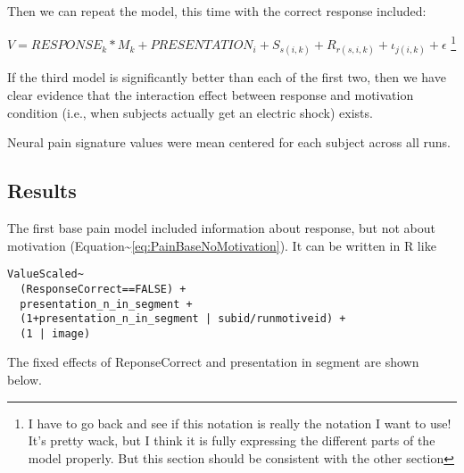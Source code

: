 \documentclass[]{article}
\let\rmarkdownfootnote\footnote%
\def\footnote{\protect\rmarkdownfootnote}
\begin{document}
Then we can repeat the model, this time with the correct response
included:

\(V=\mathit{RESPONSE}_k*M_k+\mathit{PRESENTATION}_{i} + S_{s(i, k )} + R_{r(s,i , k )} + \iota_{j(i, k)} + \epsilon\)
\footnote{I have to go back and see if this notation is really the notation I want to use! It's pretty wack, but I think it is fully expressing the different parts of the model properly. But this section should be consistent with the other section}

If the third model is significantly better than each of the first two,
then we have clear evidence that the interaction effect between response
and motivation condition (i.e., when subjects actually get an electric
shock) exists.

Neural pain signature values were mean centered for each subject across
all runs.

\subsection{Results}\label{results}

The first base pain model included information about response, but not
about motivation
(Equation\textasciitilde{}\ref{eq:PainBaseNoMotivation}). It can be
written in R like

\begin{verbatim}
ValueScaled~
  (ResponseCorrect==FALSE) + 
  presentation_n_in_segment + 
  (1+presentation_n_in_segment | subid/runmotiveid) + 
  (1 | image)
\end{verbatim}

The fixed effects of ReponseCorrect and presentation in segment are
shown below.
\end{document}
